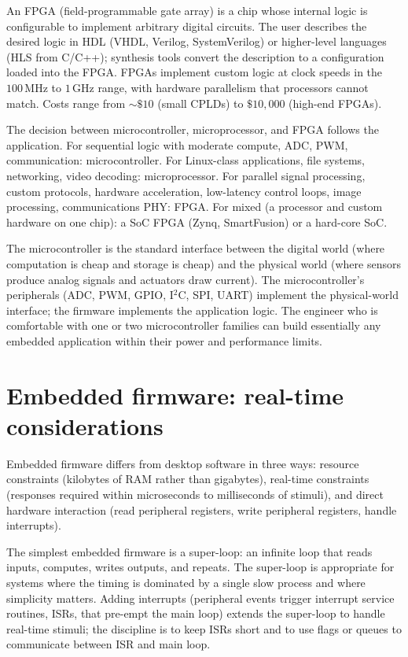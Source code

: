 An FPGA (field-programmable gate array) is a chip whose internal logic is configurable to implement arbitrary digital circuits. The user describes the desired logic in HDL (VHDL, Verilog, SystemVerilog) or higher-level languages (HLS from C/C++); synthesis tools convert the description to a configuration loaded into the FPGA. FPGAs implement custom logic at clock speeds in the $100\,\text{MHz}$ to $1\,\text{GHz}$ range, with hardware parallelism that processors cannot match. Costs range from $\sim\$10$ (small CPLDs) to $\$10{,}000$ (high-end FPGAs).

The decision between microcontroller, microprocessor, and FPGA follows the application. For sequential logic with moderate compute, ADC, PWM, communication: microcontroller. For Linux-class applications, file systems, networking, video decoding: microprocessor. For parallel signal processing, custom protocols, hardware acceleration, low-latency control loops, image processing, communications PHY: FPGA. For mixed (a processor and custom hardware on one chip): a SoC FPGA (Zynq, SmartFusion) or a hard-core SoC.

\begin{archetype}
The microcontroller is the standard interface between the digital world (where computation is cheap and storage is cheap) and the physical world (where sensors produce analog signals and actuators draw current). The microcontroller's peripherals (ADC, PWM, GPIO, I$^2$C, SPI, UART) implement the physical-world interface; the firmware implements the application logic. The engineer who is comfortable with one or two microcontroller families can build essentially any embedded application within their power and performance limits.
\end{archetype}

\section{Embedded firmware: real-time considerations}

Embedded firmware differs from desktop software in three ways: resource constraints (kilobytes of RAM rather than gigabytes), real-time constraints (responses required within microseconds to milliseconds of stimuli), and direct hardware interaction (read peripheral registers, write peripheral registers, handle interrupts).

The simplest embedded firmware is a super-loop: an infinite loop that reads inputs, computes, writes outputs, and repeats. The super-loop is appropriate for systems where the timing is dominated by a single slow process and where simplicity matters. Adding interrupts (peripheral events trigger interrupt service routines, ISRs, that pre-empt the main loop) extends the super-loop to handle real-time stimuli; the discipline is to keep ISRs short and to use flags or queues to communicate between ISR and main loop.

